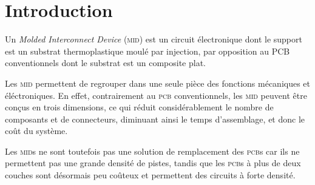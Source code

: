 \section{Introduction}
Un \emph{Molded Interconnect Device} (\textsc{mid}) est un circuit électronique
dont le support est un substrat thermoplastique moulé par injection, par
opposition au \textsc{PCB} conventionnels dont le substrat est un composite
plat.

Les \textsc{mid} permettent de regrouper dans une seule pièce des fonctions
mécaniques et éléctroniques. En effet, contrairement au \textsc{pcb} conventionnels, les
\textsc{mid} peuvent être conçus en trois dimensions, ce qui réduit
considérablement le nombre de composants et de connecteurs, diminuant ainsi le
temps d'assemblage, et donc le coût du système. 

Les \textsc{mid}s ne sont toutefois pas une solution de remplacement des
\textsc{pcb}s car ils ne permettent pas une grande densité de pistes, tandis que
les \textsc{pcb}s à plus de deux couches sont désormais peu coûteux et
permettent des circuits à forte densité.
